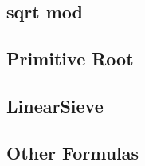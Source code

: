 \documentclass[a4paper,10pt,twocolumn,oneside,x11names]{article}
\begin{document}
\subsection{sqrt mod}


\subsection{Primitive Root}


\subsection{LinearSieve}



\subsection{Other Formulas}
\end{document}
